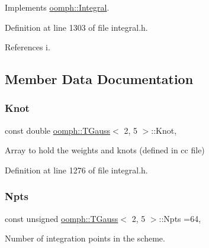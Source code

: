 Implements \hyperlink{classoomph_1_1Integral_ac65335e2aab120b285b3d6c294507b06}{oomph\+::\+Integral}.



Definition at line 1303 of file integral.\+h.



References i.



\subsection{Member Data Documentation}
\mbox{\label{classoomph_1_1TGauss_3_012_00_015_01_4_a73e2240faee36e8e48fdae037dd83619}} 
\subsubsection{\texorpdfstring{Knot}{Knot}}
{\footnotesize\ttfamily const double \hyperlink{classoomph_1_1TGauss}{oomph\+::\+T\+Gauss}$<$ 2, 5 $>$\+::Knot\hspace{0.3cm}{\ttfamily [static]}, {\ttfamily [private]}}



Array to hold the weights and knots (defined in cc file) 



Definition at line 1276 of file integral.\+h.

\mbox{\label{classoomph_1_1TGauss_3_012_00_015_01_4_a73143008f48d015ee81725470845a876}} 
\subsubsection{\texorpdfstring{Npts}{Npts}}
{\footnotesize\ttfamily const unsigned \hyperlink{classoomph_1_1TGauss}{oomph\+::\+T\+Gauss}$<$ 2, 5 $>$\+::Npts =64\hspace{0.3cm}{\ttfamily [static]}, {\ttfamily [private]}}



Number of integration points in the scheme. 



